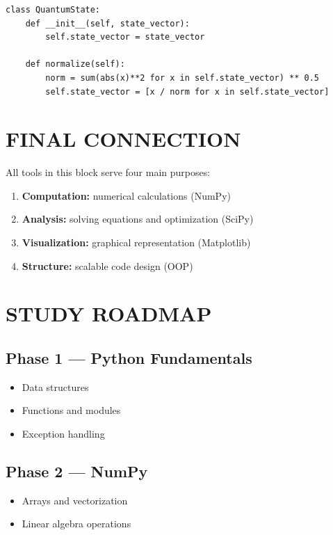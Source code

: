 \begin{verbatim}
class QuantumState:
    def __init__(self, state_vector):
        self.state_vector = state_vector

    def normalize(self):
        norm = sum(abs(x)**2 for x in self.state_vector) ** 0.5
        self.state_vector = [x / norm for x in self.state_vector]
\end{verbatim}

\vspace{0.5cm}

\section*{FINAL CONNECTION}

All tools in this block serve four main purposes:

\begin{enumerate}
\item \textbf{Computation:} numerical calculations (NumPy)
\item \textbf{Analysis:} solving equations and optimization (SciPy)
\item \textbf{Visualization:} graphical representation (Matplotlib)
\item \textbf{Structure:} scalable code design (OOP)
\end{enumerate}

\vspace{0.5cm}

\section*{STUDY ROADMAP}

\subsection*{Phase 1 --- Python Fundamentals}
\begin{itemize}
\item Data structures
\item Functions and modules
\item Exception handling
\end{itemize}

\subsection*{Phase 2 --- NumPy}
\begin{itemize}
\item Arrays and vectorization
\item Linear algebra operations
\end{itemize}

